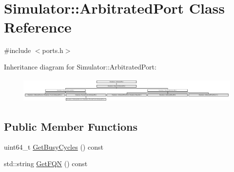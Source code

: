 \hypertarget{class_simulator_1_1_arbitrated_port}{\section{Simulator\+:\+:Arbitrated\+Port Class Reference}
\label{class_simulator_1_1_arbitrated_port}
}


{\ttfamily \#include $<$ports.\+h$>$}

Inheritance diagram for Simulator\+:\+:Arbitrated\+Port\+:\begin{figure}[H]
\begin{center}
\leavevmode
\includegraphics[height=1.346154cm]{class_simulator_1_1_arbitrated_port}
\end{center}
\end{figure}
\subsection*{Public Member Functions}
\begin{DoxyCompactItemize}
\item 
uint64\+\_\+t \hyperlink{class_simulator_1_1_arbitrated_port_a93358ad39066fe450e91648867c907ea}{Get\+Busy\+Cycles} () const 
\item 
std\+::string \hyperlink{class_simulator_1_1_arbitrated_port_a286527112fe9bbdb1f4468acc3efca0e}{Get\+F\+Q\+N} () const 
\end{DoxyCompactItemize}
